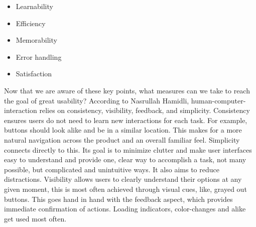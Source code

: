 \begin{itemize}
    \item Learnability

    \item Efficiency

    \item Memorability

    \item Error handling

    \item Satisfaction
\end{itemize}
\autocite{Paul:Usability101}

\blankLine

Now that we are aware of these key points, what measures can we take to reach the goal of great usability? According to Nasrullah Hamidli, human-computer-interaction relies on consistency, visibility, feedback, and simplicity. Consistency ensures users do not need to learn new interactions for each task. For example, buttons should look alike and be in a similar location. This makes for a more natural navigation across the product and an overall familiar feel. Simplicity connects directly to this. Its goal is to minimize clutter and make user interfaces easy to understand and provide one, clear way to accomplish a task, not many possible, but complicated and unintuitive ways. It also aims to reduce distractions. Visibility allows users to clearly understand their options at any given moment, this is most often achieved through visual cues, like, grayed out buttons. This goes hand in hand with the feedback aspect, which provides immediate confirmation of actions. Loading indicators, color-changes and alike get used most often.

